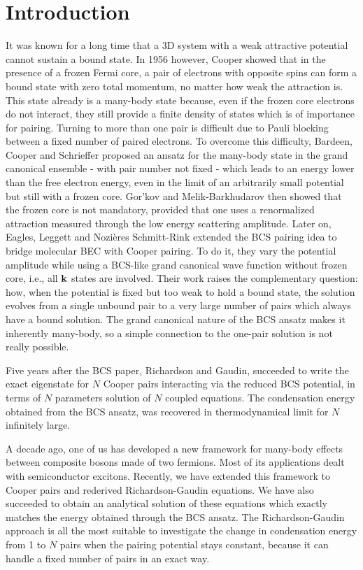 \documentclass[5p,twocolumn]{elsarticle}
\begin{document}
\section{Introduction}
It was known for a long time that a 3D system with a weak attractive potential cannot sustain a bound state.  In 1956 however, Cooper showed that in the presence of a frozen Fermi core, a pair of electrons with opposite spins can form a bound state with zero total momentum,  no matter how weak the attraction is\cite{Cooper}.  This state already is a many-body state because, even if the frozen core electrons do not interact, they still provide a finite density of states which is of importance for pairing. Turning to more than one pair is difficult due to Pauli blocking between a fixed number of paired electrons. To overcome this difficulty, Bardeen, Cooper and Schrieffer proposed an ansatz for the many-body state in the grand canonical ensemble - with  pair number not fixed - which leads to an energy lower than the free electron energy, even in the limit of an arbitrarily small potential but still with a frozen core\cite{BCS}. Gor'kov and Melik-Barkhudarov then showed that the frozen core is not
  mandatory, provided that one uses a renormalized attraction measured through the low energy scattering amplitude\cite{Gorkov}.   Later on, Eagles\cite{Eagle}, Leggett\cite{LeggettCrossover} and Nozi\`{e}res Schmitt-Rink\cite{Nozieres} extended the BCS pairing idea to bridge molecular BEC with Cooper pairing. To do it, they vary the potential amplitude while using a BCS-like grand canonical wave function without frozen core, i.e., all $\mathbf{k}$ states are involved.  Their work raises the complementary question: how, when the potential is fixed but too weak to hold a bound state, the solution evolves from a single unbound pair to a very large number of pairs which always have a bound solution. The grand canonical nature of the BCS ansatz makes it inherently many-body, so a simple connection to the one-pair solution is not really possible.  

Five years after the BCS paper, Richardson\cite{Richardson1} and Gaudin\cite{gaudin}, succeeded to write the exact eigenstate for $N$ Cooper pairs interacting via the reduced BCS potential, in terms of $N$ parameters solution of $N$ coupled equations. The condensation energy obtained from the BCS ansatz, was recovered in thermodynamical limit for $N$ infinitely large\cite{Richardson2,Richardson3,Richardson1968}. 

A decade ago, one of us has developed a new framework\cite{CobosonPhysicsReports} for many-body effects between composite bosons made of two fermions. Most of its applications dealt with semiconductor excitons.   Recently, we have extended this framework to Cooper pairs and rederived Richardson-Gaudin equations\cite{CobosonBcsRich}. We have also succeeded to obtain an analytical solution of these equations \cite{moth,CombescotCooper,combescotBCS} which exactly matches the energy obtained through the BCS ansatz.  The Richardson-Gaudin approach is all the most suitable to investigate the change in condensation energy from 1 to $N$ pairs when the pairing potential stays constant, because it can handle a fixed number of pairs in an exact way.
\end{document}
